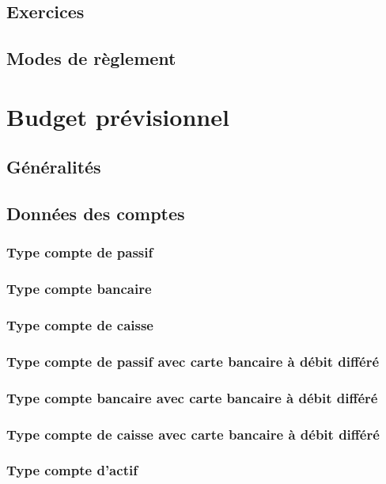 \subsection{Exercices\label{setup-resources-financialyear}}


\subsection{Modes de règlement\label{setup-resources-modes}}


\section{Budget prévisionnel\label{setup-budget}}


\subsection{Généralités\label{setup-budget-general}}


\subsection{Données des comptes\label{setup-budget-data}}

\subsubsection{Type compte de passif\label{setup-budget-data-liability}}


\subsubsection{Type compte bancaire\label{setup-budget-data-bank}}


\subsubsection{Type compte de caisse\label{setup-budget-data-cash}}


\subsubsection{Type compte de passif avec carte bancaire à débit différé\label{setup-budget-data-liabilityWithCard}}

\subsubsection{Type compte bancaire avec carte bancaire à débit différé\label{setup-budget-data-bankWithCard}}

\subsubsection{Type compte de caisse avec carte bancaire à débit différé\label{setup-budget-data-cashWithCard}}


\subsubsection{Type compte d'actif\label{setup-budget-data-asset}}




